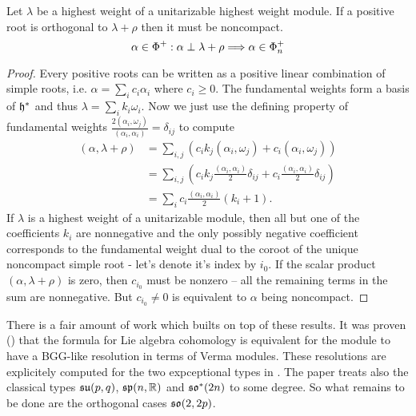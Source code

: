 \begin{lemma}\label{lem:singular_are_noncompact}
 Let $\lambda$ be a highest weight of a unitarizable highest weight module. If a positive root is orthogonal to $\lambda + \rho$ then it must be noncompact.
 \[
  \alpha \in \Phi^+: \alpha \perp \lambda + \rho \Longrightarrow \alpha \in \Phi^+_n
 \]
\end{lemma}
\begin{proof}
 Every positive roots can be written as a positive linear combination of simple roots, i.e. $\alpha = \sum_i c_i \alpha_i$ where $c_i \geq 0$. The fundamental weights form a basis of $\mathfrak{h}^*$ and thus $\lambda = \sum_i k_i \omega_i$. Now we just use the defining property of fundamental weights $\frac{2(\alpha_i,\omega_j)}{(\alpha_i,\alpha_i)} = \delta_{ij}$ to compute
 \begin{align*}
  (\alpha,\lambda+\rho) & = \sum_{i,j} \left(  c_i k_j (\alpha_i,\omega_j) + c_i (\alpha_i,\omega_j) \right ) \\
			& = \sum_{i,j} \left( c_i k_j \frac{(\alpha_i,\alpha_i)}{2} \delta_{ij} + c_i \frac{(\alpha_i,\alpha_i)}{2} \delta_{ij} \right ) \\
			& = \sum_i c_i \frac{(\alpha_i,\alpha_i)}{2} (k_i + 1).
 \end{align*}
 If $\lambda$ is a highest weight of a unitarizable module, then all but one of the coefficients $k_i$ are nonnegative and the only possibly negative coefficient corresponds to the fundamental weight dual to the coroot of the unique noncompact simple root - let's denote it's index by $i_0$. If the scalar product $(\alpha, \lambda+\rho)$ is zero, then $c_{i_0}$ must be nonzero -- all the remaining terms in the sum are nonnegative. But $c_{i_0} \neq 0$ is equivalent to $\alpha$ being noncompact.
\end{proof}



There is a fair amount of work which builts on top of these results. It was proven (\cite{enright_hilbert_2004,boe_kostant_2009}) that the formula for Lie algebra cohomology is equivalent for the module to have a BGG-like resolution in terms of Verma modules. These resolutions are explicitely computed for the two expceptional types in \cite{enright_resolutions_2004}. The paper \cite{enright_hilbert_2004} treats also the classical types $\mathfrak{su}(p,q)$, $\mathfrak{sp}(n,\mathbb{R})$ and $\mathfrak{so}^*(2n)$ to some degree. So what remains to be done are the orthogonal cases $\mathfrak{so}(2,2p)$. 

